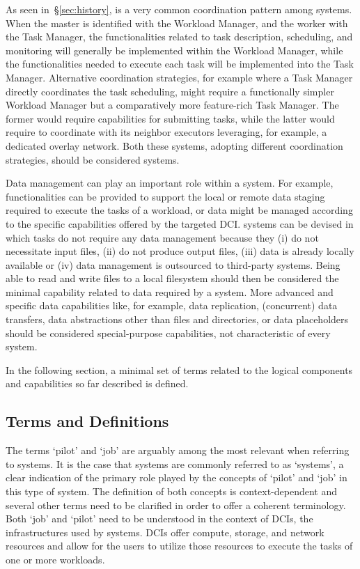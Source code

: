 \documentclass{sig-alternate}
\begin{document}
As seen in~\S\ref{sec:history}, \MW is a very common coordination pattern among
\pilot systems. When the master is identified with the Workload Manager, and
the worker with the Task Manager, the functionalities related to task
description, scheduling, and monitoring will generally be implemented within
the Workload Manager, while the functionalities needed to execute each task
will be implemented into the Task Manager. Alternative coordination strategies,
for example where a Task Manager directly coordinates the task scheduling,
might require a functionally simpler Workload Manager but a comparatively more
feature-rich Task Manager. The former would require capabilities for submitting
tasks, while the latter would require to coordinate with its neighbor executors
leveraging, for example, a dedicated overlay network. Both these systems,
adopting different coordination strategies, should be considered \pilot
systems.

Data management can play an important role within a \pilot system. For example,
functionalities can be provided to support the local or remote data staging
required to execute the tasks of a workload, or data might be managed according
to the specific capabilities offered by the targeted DCI. \pilot systems can be
devised in which tasks do not require any data management because they (i) do
not necessitate input files, (ii) do not produce output files, (iii) data is
already locally available or (iv) data management is outsourced to third-party
systems. Being able to read and write files to a local filesystem should then
be considered the minimal capability related to data required by a \pilot
system. More advanced and specific data capabilities like, for example, data
replication, (concurrent) data transfers, data abstractions other than files
and directories, or data placeholders should be considered special-purpose
capabilities, not characteristic of every \pilot system.

In the following section, a minimal set of terms related to the logical
components and capabilities so far described is defined.

\subsection{Terms and Definitions}
\label{sec:termsdefs}

The terms `pilot' and `job' are arguably among the most relevant when referring
to \pilot systems. It is the case that \pilot systems are commonly referred to
as `\pilotjob systems', a clear indication of the primary role played by the
concepts of `pilot' and `job' in this type of system. The definition of both
concepts is context-dependent and several other terms need to be clarified in
order to offer a coherent terminology. Both `job' and `pilot' need to be
understood in the context of DCIs, the infrastructures used by \pilot systems.
DCIs offer compute, storage, and network resources and \pilots allow for the
users to utilize those resources to execute the tasks of one or more workloads.
\end{document}
